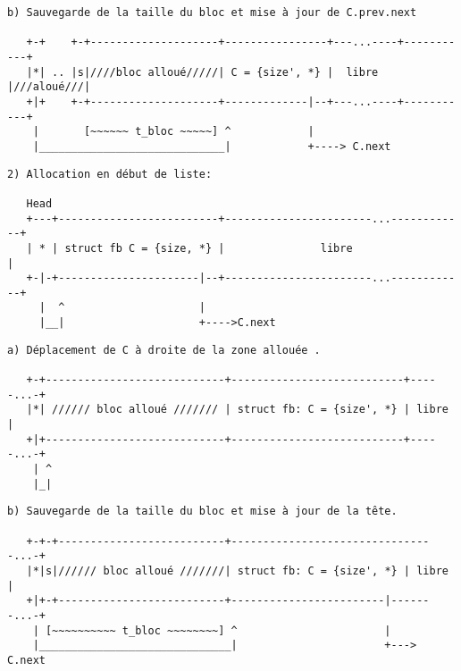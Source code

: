 \documentclass[11pt]{article}
\theoremstyle{definition}
\begin{document}
\begin{lstlisting}[columns=fixed,basicstyle=\scriptsize\ttfamily]
  b) Sauvegarde de la taille du bloc et mise à jour de C.prev.next

   +-+    +-+--------------------+----------------+---...----+-----------+
   |*| .. |s|////bloc alloué/////| C = {size', *} |  libre   |///aloué///|
   +|+    +-+--------------------+-------------|--+---...----+-----------+
    |       [~~~~~~ t_bloc ~~~~~] ^            |
    |_____________________________|            +----> C.next
\end{lstlisting}

\begin{lstlisting}[columns=fixed,basicstyle=\scriptsize\ttfamily]
  2) Allocation en début de liste:

   Head
   +---+-------------------------+-----------------------...------------+
   | * | struct fb C = {size, *} |               libre                  |
   +-|-+----------------------|--+-----------------------...------------+
     |  ^                     |
     |__|                     +---->C.next
\end{lstlisting}

\begin{lstlisting}[columns=fixed,basicstyle=\scriptsize\ttfamily]
  a) Déplacement de C à droite de la zone allouée .

   +-+----------------------------+---------------------------+-----...-+
   |*| ////// bloc alloué /////// | struct fb: C = {size', *} | libre   |
   +|+----------------------------+---------------------------+-----...-+
    | ^
    |_|
\end{lstlisting}

\begin{lstlisting}[columns=fixed,basicstyle=\scriptsize\ttfamily]
  b) Sauvegarde de la taille du bloc et mise à jour de la tête.

   +-+-+--------------------------+--------------------------------...-+
   |*|s|////// bloc alloué ///////| struct fb: C = {size', *} | libre  |
   +|+-+--------------------------+------------------------|-------...-+
    | [~~~~~~~~~~ t_bloc ~~~~~~~~] ^                       |
    |______________________________|                       +---> C.next
\end{lstlisting}
\end{document}
